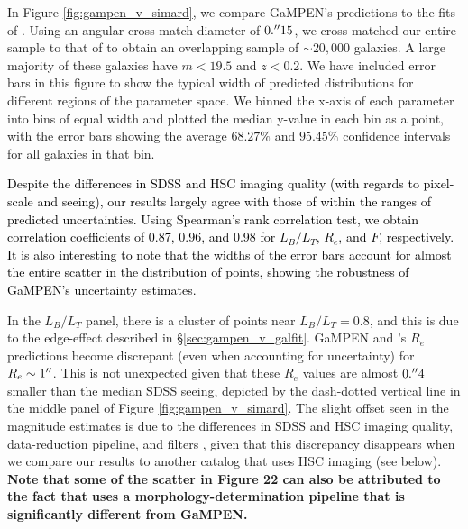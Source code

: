 \documentclass[linenumbers,twocolumn,twocolappendix]{aastex631}
\newcommand\gampen{GaMPEN}
\begin{document}
\begin{CJK*}{UTF8}{gbsn}
In Figure \ref{fig:gampen_v_simard}, we compare \gampen{}'s predictions to the fits of \citet{simard_11}. Using an angular cross-match diameter of $0.\mbox{$^{\prime\prime}$}15$, we cross-matched our entire sample to that of \citet{simard_11} to obtain an overlapping sample of $\sim20,000$ galaxies. A large majority of these galaxies have $m < 19.5$ and $z < 0.2$. We have included error bars in this figure to show the typical width of predicted distributions for different regions of the parameter space. We binned the x-axis of each parameter into bins of equal width and plotted the median y-value in each bin as a point, with the error bars showing the average $68.27\%$ and $95.45\%$ confidence intervals for all galaxies in that bin. 

\textcolor{black}{Despite the differences in SDSS and HSC imaging quality (with regards to pixel-scale and seeing), our results largely agree with those of \citet{simard_11} within the ranges of predicted uncertainties. Using Spearman's rank correlation test, we obtain correlation coefficients of 0.87, 0.96, and 0.98 for $L_B/L_T$, $R_e$, and $F$, respectively. It is also interesting to note that the widths of the error bars account for almost the entire scatter in the distribution of points, showing the robustness of \gampen{}'s uncertainty estimates.}

In the $L_B/L_T$ panel, there is a cluster of points near $L_B/L_T = 0.8$, and this is due to the edge-effect described in \S \ref{sec:gampen_v_galfit}. \gampen{} and \citet{simard_11}'s $R_e$ predictions become discrepant (even when accounting for uncertainty) for $R_e \sim 1\mbox{$^{\prime\prime}$}$. This is not unexpected given that these $R_e$ values are almost $0.\mbox{$^{\prime\prime}$}4$ smaller than the median SDSS seeing, depicted by the dash-dotted vertical line in the middle panel of Figure \ref{fig:gampen_v_simard}. The slight offset seen in the magnitude estimates is due to the differences in SDSS and HSC imaging quality, data-reduction pipeline, and filters \citep{hsc_filters}, given that this discrepancy disappears when we compare our results to another catalog that uses HSC imaging (see below). \textbf{Note that some of the scatter in Figure 22 can also be attributed to the fact that \citet{simard_11} uses a morphology-determination pipeline that is significantly different from \gampen{}.}


\end{CJK*}
\end{document}
